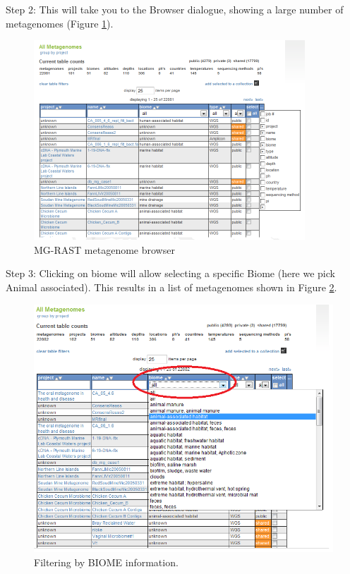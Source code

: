 \documentclass[12pt,fullpage]{report}
\begin{document}
Step 2: This will take you to the Browser dialogue, showing a large number of metagenomes (Figure \ref{fig:browse-window}).

\begin{figure}
\begin{center}
\includegraphics[width=4in]{Images/collections-browse-window.png}
\end{center}
\caption{
MG-RAST metagenome browser}
\label{fig:browse-window}
\end{figure}

Step 3: Clicking on biome will allow selecting a specific Biome (here we pick Animal associated).
This results in a list of metagenomes shown in 
Figure \ref{fig:collections-filter-by-biome}.

\begin{figure}
\begin{center}
\includegraphics[width=6in]{Images/collections-filter-by-biome.png}
\end{center}
\caption{
Filtering by BIOME information. }
\label{fig:collections-filter-by-biome}
\end{figure}
\end{document}

